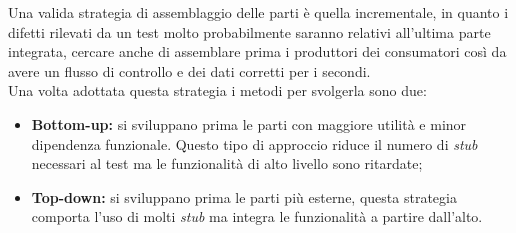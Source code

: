 Una valida strategia di assemblaggio delle parti è quella incrementale, in quanto i difetti rilevati da un test molto probabilmente saranno relativi all'ultima parte integrata, cercare anche di assemblare prima i produttori dei consumatori così da avere un flusso di controllo e dei dati corretti per i secondi.\\
Una volta adottata questa strategia i metodi per svolgerla sono due:
\begin{itemize}
	\item \textbf{Bottom-up:} si sviluppano prima le parti con maggiore utilità e minor dipendenza funzionale. Questo tipo di approccio riduce il numero di \textit{stub} necessari al test ma le funzionalità di alto livello sono ritardate;
	\item \textbf{Top-down:} si sviluppano prima le parti più esterne, questa strategia comporta l'uso di molti \textit{stub} ma integra le funzionalità a partire dall'alto.
\end{itemize}

